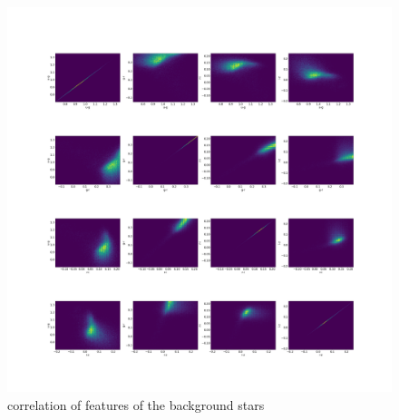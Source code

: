 \documentclass[%
 reprint,
 amsmath,amssymb,
 aps,
]{revtex4-2}
\begin{document}
 \begin{figure}[]
	\centering
	\includegraphics[width=1\textwidth]{figs/correlation_features.png}
	\caption[ correlation of features of the background stars]
	{\small correlation of features of the background stars} 
		\label{fig:corr0}
\end{figure}
\end{document}
